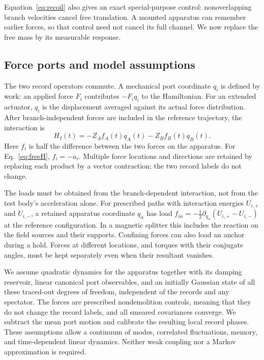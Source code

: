 \documentclass[aps,pra,reprint,amsmath,amssymb,longbibliography,floatfix]{revtex4-2}
\begin{document}
Equation~\eqref{eq:recoil} also gives an exact special-purpose control: nonoverlapping branch velocities cancel free translation. A mounted apparatus can remember earlier forces, so that control need not cancel its full channel. We now replace the free mass by its measurable response.

\subsection{Force ports and model assumptions}
The two record operators commute. A mechanical port coordinate $q_i$ is defined by work: an applied force $F_i$ contributes $-F_iq_i$ to the Hamiltonian. For an extended actuator, $q_i$ is the displacement averaged against its actual force distribution. After branch-independent forces are included in the reference trajectory, the interaction is
\begin{equation}
H_I(t)=-Z_A f_A(t)q_A(t)-Z_B f_B(t)q_B(t).
\label{eq:HI}
\end{equation}
Here $f_i$ is half the difference between the two forces on the apparatus. For Eq.~\eqref{eq:freeH}, $f_i=-a_i$. Multiple force locations and directions are retained by replacing each product by a vector contraction; the two record labels do not change.

The loads must be obtained from the branch-dependent interaction, not from the test body's acceleration alone. For prescribed paths with interaction energies $U_{i,+}$ and $U_{i,-}$, a retained apparatus coordinate $q_\alpha$ has load $f_{i\alpha}= -\tfrac12\partial_{q_\alpha}(U_{i,+}-U_{i,-})$ at the reference configuration. In a magnetic splitter this includes the reaction on the field sources and their supports. Confining forces can also load an anchor during a hold. Forces at different locations, and torques with their conjugate angles, must be kept separately even when their resultant vanishes.

We assume quadratic dynamics for the apparatus together with its damping reservoir, linear canonical port observables, and an initially Gaussian state of all these traced-out degrees of freedom, independent of the records and any spectator. The forces are prescribed nondemolition controls, meaning that they do not change the record labels, and all smeared covariances converge. We subtract the mean port motion and calibrate the resulting local record phases. These assumptions allow a continuum of modes, correlated fluctuations, memory, and time-dependent linear dynamics. Neither weak coupling nor a Markov approximation is required.
\end{document}
